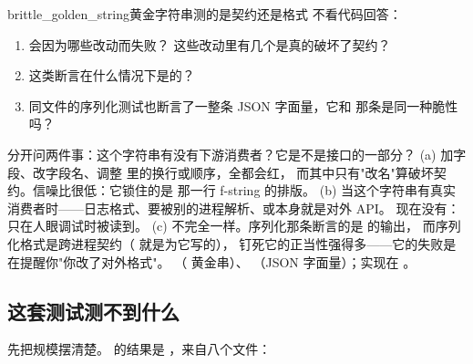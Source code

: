 \begin{checkpoint}{brittle_golden_string}{黄金字符串测的是契约还是格式}
不看代码回答：
\begin{enumerate}[label=(\alph*)]
  \item {} 会因为哪些改动而失败？
        这些改动里有几个是真的破坏了契约？
  \item 这类断言在什么情况下是的？
  \item 同文件的序列化测试也断言了一整条 JSON 字面量，它和  那条是同一种脆性吗？
\end{enumerate}
\hint 分开问两件事：这个字符串有没有下游消费者？它是不是接口的一部分？
\ifshowanswers
\tcblower
\answer (a) 加字段、改字段名、调整  里的换行或顺序，全都会红，
而其中只有"改名"算破坏契约。信噪比很低：它锁住的是
 那一行 f-string 的排版。
(b) 当这个字符串有真实消费者时——日志格式、要被别的进程解析、或本身就是对外 API。
现在没有： 只在人眼调试时被读到。
(c) 不完全一样。序列化那条断言的是  的输出，
而序列化格式是跨进程契约（ 就是为它写的），
钉死它的正当性强得多——它的失败是在提醒你"你改了对外格式"。
\whereincode {}（ 黄金串）、
（JSON 字面量）；实现在
。
\fi
\end{checkpoint}

\subsection{这套测试测不到什么}
\label{sec:test-gaps}

先把规模摆清楚。 的结果是
，来自八个文件：

